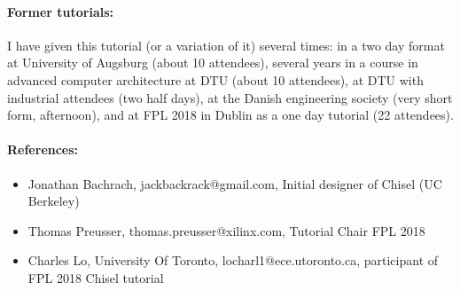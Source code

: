 \documentclass{article}
\begin{document}
\paragraph{Former tutorials:} I have given this tutorial (or a variation of it) several times:
in a two day format at University of Augsburg (about 10 attendees), several years
in a course in advanced computer architecture at DTU (about 10 attendees), at DTU with industrial attendees
(two half days), at the Danish engineering society (very short form, afternoon),
and at FPL 2018 in Dublin as a one day tutorial (22 attendees).

 \paragraph{References:}

\begin{itemize}
\item Jonathan Bachrach, jackbackrack@gmail.com, Initial designer of Chisel (UC Berkeley)
\item Thomas Preusser, thomas.preusser@xilinx.com, Tutorial Chair FPL 2018
\item Charles Lo, University Of Toronto, locharl1@ece.utoronto.ca, participant of FPL 2018 Chisel tutorial
\end{itemize}


%
%
%
%
%
%
%
\end{document}
